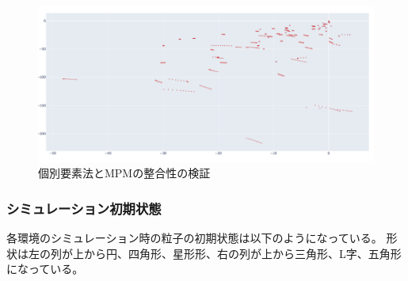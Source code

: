 \documentclass[12pt]{ltjsarticle}
\begin{document}
\begin{figure}[htbp]
  \begin{center}
  \includegraphics*[scale=1.0]{check_consistency.png}
  \end{center}
\caption{個別要素法とMPMの整合性の検証}
\end{figure}

\subsubsection{シミュレーション初期状態}
各環境のシミュレーション時の粒子の初期状態は以下のようになっている。
形状は左の列が上から円、四角形、星形形、右の列が上から三角形、L字、五角形になっている。

\clearpage
\end{document}
